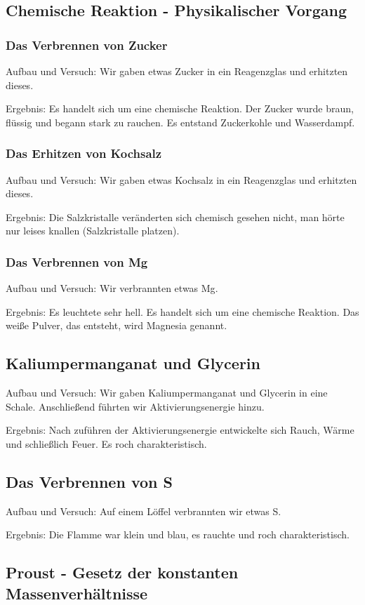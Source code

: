 \subsection{Chemische Reaktion - Physikalischer Vorgang}
\label{Experimente - Chemische Reaktion - Physikalischer Vorgang}
\subsubsection{Das Verbrennen von Zucker}
Aufbau und Versuch: Wir gaben etwas Zucker in ein Reagenzglas und erhitzten dieses.

Ergebnis: Es handelt sich um eine chemische  Reaktion. Der Zucker wurde braun, flüssig und begann stark zu rauchen. Es
entstand Zuckerkohle und Wasserdampf.
\subsubsection{Das Erhitzen von Kochsalz}
Aufbau und Versuch: Wir gaben etwas Kochsalz in ein Reagenzglas und erhitzten dieses.

Ergebnis: Die Salzkristalle veränderten sich chemisch gesehen nicht, man hörte nur leises knallen (Salzkristalle platzen).
\subsubsection{Das Verbrennen von \acf{Mg}}
Aufbau und Versuch: Wir verbrannten etwas \acf{Mg}.

Ergebnis: Es leuchtete sehr hell.
Es handelt sich um eine chemische Reaktion. Das weiße Pulver, das entsteht, wird Magnesia genannt.
\subsection{Kaliumpermanganat und Glycerin}
Aufbau und Versuch: Wir gaben Kaliumpermanganat und Glycerin in eine Schale. Anschließend führten wir
Aktivierungsenergie
hinzu.

Ergebnis: Nach zuführen der Aktivierungsenergie entwickelte sich Rauch, Wärme und schließlich Feuer. Es roch
charakteristisch.
\subsection{Das Verbrennen von \acf{S}}
Aufbau und Versuch: Auf einem Löffel verbrannten wir etwas \acf{S}.

Ergebnis: Die Flamme war klein und blau, es rauchte und roch charakteristisch.
\subsection{Proust - Gesetz der konstanten Massenverhältnisse}
\label{Experimente - Proust}
